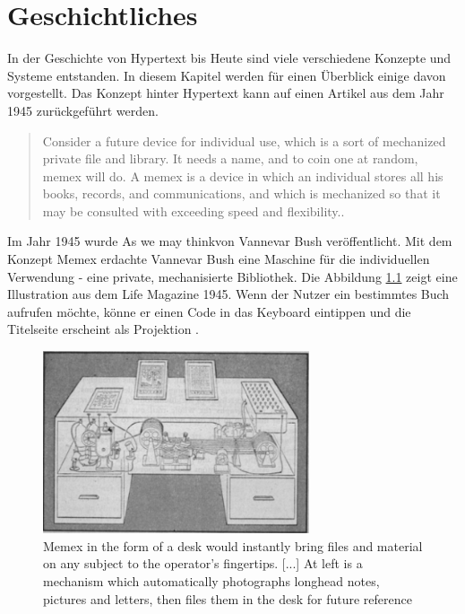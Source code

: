 \chapter{Geschichtliches}
\label{ch:Geschichtlich}

In der Geschichte von Hypertext bis Heute sind viele verschiedene Konzepte und Systeme entstanden. In diesem Kapitel werden für einen Überblick einige davon vorgestellt. Das Konzept hinter Hypertext kann auf einen Artikel aus dem Jahr 1945 zurückgeführt werden.

\begin{quote}
	\glqq Consider a future device for individual use, which is a sort of mechanized private file and library. It needs a name, and to coin one at random, memex will do. A memex is a device in which an individual stores all his books, records, and communications, and which is mechanized so that it may be consulted with exceeding speed and flexibility.\grqq{ }\cite[Section 6]{Bush1945}.
\end{quote}

Im Jahr 1945 wurde \glqq As we may think\grqq{ }von Vannevar Bush veröffentlicht. Mit dem Konzept \glqq Memex\grqq{ } erdachte Vannevar Bush eine Maschine für die individuellen Verwendung - eine private, mechanisierte Bibliothek. Die Abbildung \ref{fig:memex} zeigt eine Illustration aus dem Life Magazine 1945. Wenn der Nutzer ein bestimmtes Buch aufrufen möchte, könne er einen Code in das Keyboard eintippen und die Titelseite erscheint als Projektion \cite[S.121]{Life1945} \cite[Section 6]{Bush1945}. 

\begin{figure}[H]
	\centering
	\includegraphics[width=0.7\textwidth]{image/memex}
	\caption{\glqq Memex in the form of a desk would instantly bring files and material on any subject to the operator's fingertips. [...] At left is a mechanism which automatically photographs longhead notes, pictures and letters, then files them in the desk for future reference\grqq{ } \cite[S.123]{Life1945}}
	\label{fig:memex}
\end{figure}

